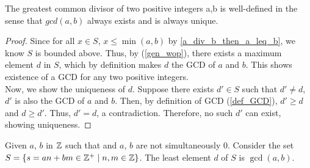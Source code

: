 \begin{theorem}  
 The greatest common divisor of two positive integers a,b is well-defined in the sense that $gcd(a,b)$ always exists and is always unique. 
\end{theorem}

\begin{proof}
\noindent Since for all $x \in S$, $x\leq \min{(a,b)} $  by \ref{a_div_b_then_a_leq_b}, we know $S$ is bounded above. Thus, by (\ref{gen_wop}), there exists a maximum element $d$ in $S$, which by definition makes $d$ the GCD of $a$ and $b$. This shows existence of a GCD for any two positive integers. \\

Now, we show the uniqueness of $d$. Suppose there exists $d' \in S$ such that $d'\neq d$, $d'$ is also the GCD of $a$ and $b$. Then, by definition of GCD (\ref{def_GCD}), $d' \geq d$ and $d\geq d'$. Thus, $d'=d$, a contradiction. Therefore, no such $d'$ can exist, showing uniqueness.
\end{proof}


\begin{theorem}  \label{Bezout}
    Given $a$, $b$ in $\mathbb{Z}$ such that and $a$, $b$ are not simultaneously 0. Consider the set $S=\{ s=an+bm \in \mathbb{Z}^+ \mid n, m \in \mathbb{Z}\}$. The least element $d$ of $S$ is $\gcd(a, b)$.
\end{theorem}

